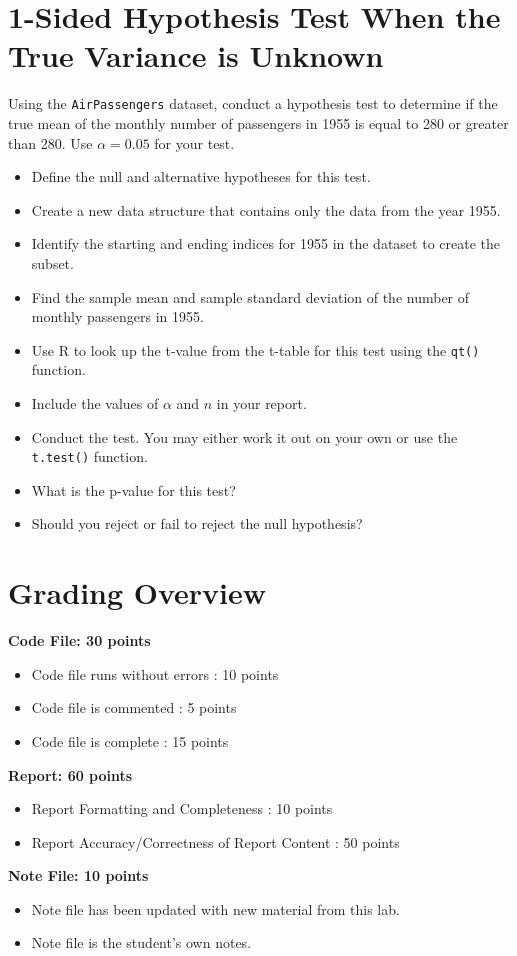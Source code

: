 \documentclass{article}
\begin{document}
\section*{1-Sided Hypothesis Test When the True Variance is Unknown}
Using the \texttt{AirPassengers} dataset, conduct a hypothesis test to determine if the true mean of the monthly number of passengers in 1955 is equal to 280 or greater than 280. Use $\alpha = 0.05$ for your test.

\begin{itemize}
    \item Define the null and alternative hypotheses for this test.
    \item Create a new data structure that contains only the data from the year 1955. 
    \item Identify the starting and ending indices for 1955 in the dataset to create the subset.
    \item Find the sample mean and sample standard deviation of the number of monthly passengers in 1955.
    \item Use R to look up the t-value from the t-table for this test using the \texttt{qt()} function.
    \item Include the values of $\alpha$ and $n$ in your report.
    \item Conduct the test. You may either work it out on your own or use the \texttt{t.test()} function.
    \item What is the p-value for this test?
    \item Should you reject or fail to reject the null hypothesis?
\end{itemize}

\section*{Grading Overview}
\textbf{Code File: 30 points}
\begin{itemize}
    \item Code file runs without errors : 10 points
    \item Code file is commented : 5 points
    \item Code file is complete : 15 points
\end{itemize}

\textbf{Report: 60 points}
\begin{itemize}
    \item Report Formatting and Completeness : 10 points
    \item Report Accuracy/Correctness of Report Content : 50 points
\end{itemize}

\textbf{Note File: 10 points}
\begin{itemize}
    \item Note file has been updated with new material from this lab.
    \item Note file is the student’s own notes.
\end{itemize}
\end{document}
